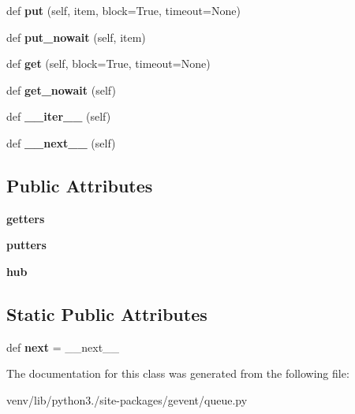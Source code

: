 \begin{DoxyCompactItemize}
def {\bfseries put} (self, item, block=True, timeout=None)
\item 
\mbox{\label{classgevent_1_1queue_1_1_channel_a89da9339d3bf5802fcfa86116e21a995}} 
def {\bfseries put\+\_\+nowait} (self, item)
\item 
\mbox{\label{classgevent_1_1queue_1_1_channel_a97f340a48143e083afffdee2318ed4ef}} 
def {\bfseries get} (self, block=True, timeout=None)
\item 
\mbox{\label{classgevent_1_1queue_1_1_channel_a026e756021f3e312583e9b63db7215f8}} 
def {\bfseries get\+\_\+nowait} (self)
\item 
\mbox{\label{classgevent_1_1queue_1_1_channel_af73ceda73518f158c7ce238f6730ba60}} 
def {\bfseries \+\_\+\+\_\+iter\+\_\+\+\_\+} (self)
\item 
\mbox{\label{classgevent_1_1queue_1_1_channel_af66d6e5d5439ff0b143e321d4fc6975f}} 
def {\bfseries \+\_\+\+\_\+next\+\_\+\+\_\+} (self)
\end{DoxyCompactItemize}
\subsection*{Public Attributes}
\begin{DoxyCompactItemize}
\item 
\mbox{\label{classgevent_1_1queue_1_1_channel_a3f84827af4d1cc8138af713179326c40}} 
{\bfseries getters}
\item 
\mbox{\label{classgevent_1_1queue_1_1_channel_a51f91533f9df7f8caabfa4c2ad86135b}} 
{\bfseries putters}
\item 
\mbox{\label{classgevent_1_1queue_1_1_channel_a5808e1f176f6eaff5a2b828e417f6657}} 
{\bfseries hub}
\end{DoxyCompactItemize}
\subsection*{Static Public Attributes}
\begin{DoxyCompactItemize}
\item 
\mbox{\label{classgevent_1_1queue_1_1_channel_ad7e5f5bf9cc6383ae1bb12327343a633}} 
def {\bfseries next} = \+\_\+\+\_\+next\+\_\+\+\_\+
\end{DoxyCompactItemize}


The documentation for this class was generated from the following file\+:\begin{DoxyCompactItemize}
\item 
venv/lib/python3./site-\/packages/gevent/queue.\+py\end{DoxyCompactItemize}
